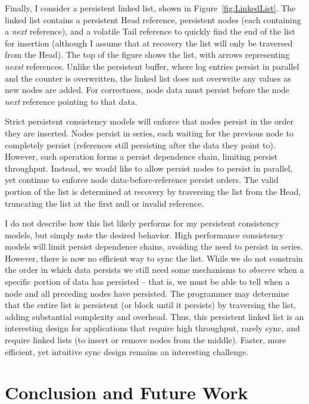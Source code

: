 

Finally, I consider a persistent linked list, shown in Figure~\ref{fig:LinkedList}.
The linked list contains a persistent Head reference, persistent nodes (each containing a \emph{next} reference), and a volatile Tail reference to quickly find the end of the list for insertion (although I assume that at recovery the list will only be traversed from the Head).
The top of the figure shows the list, with arrows representing \emph{nexst} references.
Unlike the persistent buffer, where log entries persist in parallel and the counter is overwritten, the linked list does not overwrite any values as new nodes are added.
For correctness, node data must persist before the node \emph{next} reference pointing to that data.

Strict persistent consistency models will enforce that nodes persist in the order they are inserted.
Nodes persist in series, each waiting for the previous node to completely persist (references still persisting after the data they point to).
However, such operation forms a persist dependence chain, limiting persist throughput.
Instead, we would like to allow persist nodes to persist in parallel, yet continue to enforce node data-before-reference persist orders.
The valid portion of the list is determined at recovery by traversing the list from the Head, truncating the list at the first null or invalid reference.

I do not describe how this list likely performs for my persistent consistency models, but simply note the desired behavior.
High performance consistency models will limit persist dependence chains, avoiding the need to persist in series.
However, there is now no efficient way to sync the list.
While we do not constrain the order in which data persists we still need some mechanisms to \emph{observe} when a specific portion of data has persisted -- that is, we must be able to tell when a node and all preceding nodes have persisted.
The programmer may determine that the entire list is persistent (or block until it persists) by traversing the list, adding substantial complexity and overhead.
Thus, this persistent linked list is an interesting design for applications that require high throughput, rarely sync, and require linked lists (to insert or remove nodes from the middle).
Faster, more efficient, yet intuitive sync design remains an interesting challenge.

\section{Conclusion and Future Work}
\label{sec:PMC_patterns:Conclusion}

